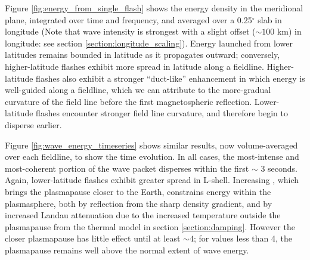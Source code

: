 Figure \ref{fig:energy_from_single_flash} shows the energy density in the meridional plane, integrated over time and frequency, and averaged over a 0.25$^\circ$ slab in longitude (Note that wave intensity is strongest with a slight offset ($\sim 100$ km) in longitude: see section \ref{section:longitude_scaling}). Energy launched from lower latitudes remains bounded in latitude as it propagates outward; conversely, higher-latitude flashes exhibit more spread in latitude along a fieldline. Higher-latitude flashes also exhibit a stronger ``duct-like'' enhancement in which energy is well-guided along a fieldline, which we can attribute to the more-gradual curvature of the field line before the first magnetospheric reflection. Lower-latitude flashes encounter stronger field line curvature, and therefore begin to disperse earlier. 

Figure \ref{fig:wave_energy_timeseries} shows similar results, now volume-averaged over each fieldline, to show the time evolution. In all cases, the most-intense and most-coherent portion of the wave packet disperses within the first $\sim$ 3 seconds. Again, lower-latitude flashes exhibit greater spread in L-shell. Increasing \kp{}, which brings the plasmapause closer to the Earth, constrains energy within the plasmasphere, both by reflection from the sharp density gradient, and by increased Landau attenuation due to the increased temperature outside the plasmapause from the thermal model in section \ref{section:damping}. However the closer plasmapause has little effect until at least \kp{}$\sim 4$; for \kp{} values less than 4, the plasmapause remains well above the normal extent of wave energy. 

